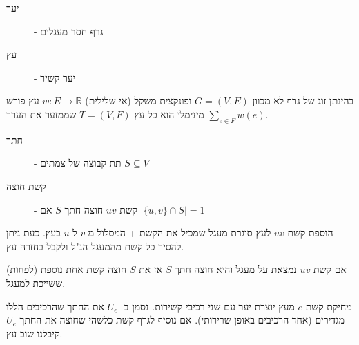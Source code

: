 \begin{description}
\item[יער] - 
גרף חסר מעגלים
\item[עץ] - 
יער קשיר
\end{description}

\begin{definition}
בהינתן זוג של גרף לא מכוון 
$G = (V, E)$
ופונקצית משקל (אי שלילית)
$w:E \to \mathbb{R}$
עץ פורש מינימלי הוא כל עץ 
$T = (V, F)$
שממזער את הערך 
$\displaystyle\sum_{e \in F} w(e)$.
\end{definition}


\begin{description}
\item[חתך] - 
תת קבוצה של צמתים 
$S \subseteq V$
\item[קשת חוצה] - 
קשת $uv$ חוצה חתך $S$ אם 
$| \{u,v\} \cap S | = 1$
\end{description}

\begin{observation}
הוספת קשת $uv$ לעץ סוגרת מעגל שמכיל את הקשת + המסלול מ-$v$ ל-$u$ בעץ.
כעת ניתן להסיר כל קשת מהמעגל הנ"ל ולקבל בחזרה עץ.
\end{observation}

\begin{observation}
\label{observation:cycle}
אם קשת $uv$ נמצאת על מעגל והיא חוצה חתך $S$ אז את $S$ חוצה קשת אחת נוספת (לפחות)
ששייכת למעגל.
\end{observation}

\begin{observation}
מחיקת קשת $e$ מעץ יוצרת יער עם שני רכיבי קשירות.
נסמן ב-%
$U_e$
את החתך שהרכיבים הללו מגדירים (אחד הרכיבים באופן שרירותי).
אם נוסיף לגרף קשת כלשהי שחוצה את החתך 
$U_e$
קיבלנו שוב עץ.
\end{observation}

